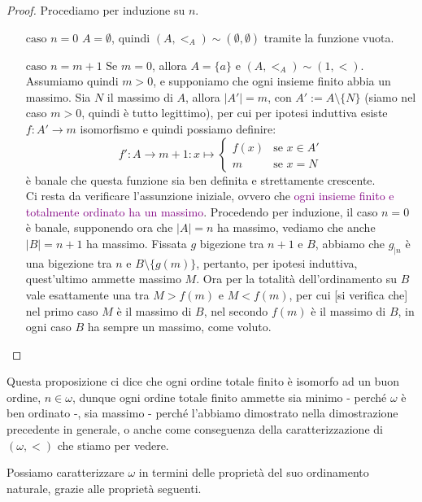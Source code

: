 \begin{proof}
	Procediamo per induzione su $n$.
	\begin{itemize}
		\item[$\boxed{\text{caso $n = 0$}}$] $A = \emptyset$, quindi $(A,<_A) \sim (\emptyset,\emptyset)$ tramite la funzione vuota.
		\item[$\boxed{\text{caso $n = m + 1$}}$] Se $m = 0$, allora $A = \{a\}$ e $(A,<_A) \sim (1,<)$. Assumiamo quindi $m > 0$, e supponiamo che ogni insieme finito abbia un massimo.
		Sia $N$ il massimo di $A$, allora  $|A'| = m$, con $A' := A \setminus\{N\}$ (siamo nel caso $m > 0$, quindi è tutto legittimo), per cui per ipotesi induttiva esiste $f : A' \to m$ isomorfismo e quindi possiamo definire:
		\[ f' : A \to m + 1 : x \mapsto \begin{cases}
			f(x) &\text{se $x \in A'$} \\
			m &\text{se $x = N$}
		\end{cases}
			\]
		è banale che questa funzione sia ben definita e strettamente crescente.\\
		Ci resta da verificare l'assunzione iniziale, ovvero che \textcolor{purple}{ogni insieme finito e totalmente ordinato ha un massimo}.
		Procedendo per induzione, il caso $n = 0$ è banale, supponendo ora che $|A| = n$ ha massimo, vediamo che anche $|B| = n + 1$ ha massimo.
		Fissata $g$ bigezione tra $n + 1$ e $B$, abbiamo che $g_{|n}$ è una bigezione tra $n$ e $B \setminus\{g(m)\}$, pertanto, per ipotesi induttiva, quest'ultimo ammette massimo $M$.
		Ora per la totalità dell'ordinamento su $B$ vale esattamente una tra $M > f(m)$ e $M < f(m)$, per cui [si verifica che] nel primo caso $M$ è il massimo di $B$, nel secondo $f(m)$ è il massimo di $B$,
		in ogni caso $B$ ha sempre un massimo, come voluto.
	\end{itemize}
\end{proof}

\begin{remark}
	Questa proposizione ci dice che ogni ordine totale finito è isomorfo ad un buon ordine, $n \in \omega$, dunque ogni ordine totale finito ammette sia minimo - perché $\omega$ è ben ordinato -,
	sia massimo - perché l'abbiamo dimostrato nella dimostrazione precedente in generale, o anche come conseguenza della caratterizzazione di $(\omega,<)$ che stiamo per vedere.
\end{remark}

Possiamo caratterizzare $\omega$ in termini delle proprietà del suo ordinamento naturale, grazie alle proprietà seguenti.

